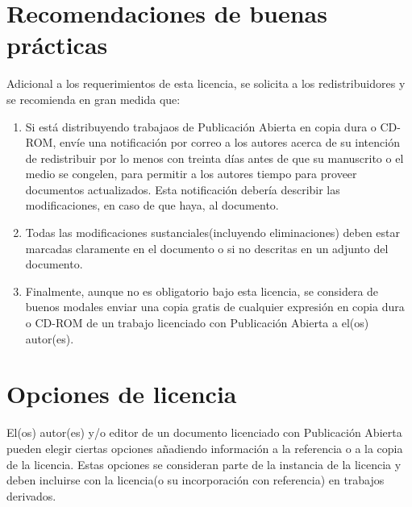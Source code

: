\section{Recomendaciones de buenas prácticas}

Adicional a los requerimientos de esta licencia, se solicita a los
redistribuidores y se recomienda en gran medida que:

\begin{enumerate}
\item Si está distribuyendo trabajaos de Publicación Abierta en copia
  dura o CD-ROM, envíe una notificación por correo a los autores
  acerca de su intención de redistribuir por lo menos con treinta días
  antes de que su manuscrito o el medio se congelen, para permitir a
  los autores tiempo para proveer documentos actualizados.  Esta
  notificación debería describir las modificaciones, en caso de que
  haya, al documento.
\item Todas las modificaciones sustanciales(incluyendo eliminaciones)
  deben estar marcadas claramente en el documento o si no descritas en
  un adjunto del documento.
\item Finalmente, aunque no es obligatorio bajo esta licencia, se
  considera de buenos modales enviar una copia gratis de cualquier
  expresión en copia dura o CD-ROM de un trabajo licenciado con
  Publicación Abierta a el(os) autor(es).
\end{enumerate}

\section{Opciones de licencia}
\label{sec:opl:options}

El(os) autor(es) y/o editor de un documento licenciado con Publicación
Abierta pueden elegir ciertas opciones añadiendo información a la
referencia o a la copia de la licencia.  Estas opciones se consideran
parte de la instancia de la licencia y deben incluirse con la
licencia(o su incorporación con referencia) en trabajos derivados.

